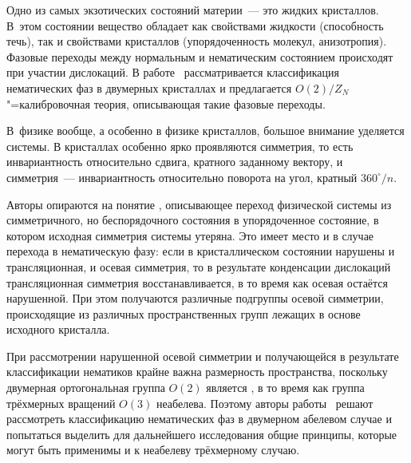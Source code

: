 \documentclass[a4paper, 14pt, titlepage]{extarticle}
\begin{document}
  Одно из самых экзотических состояний материи~--- это  жидких кристаллов.
  В~этом состоянии вещество обладает как свойствами жидкости (способность течь), так и свойствами
  кристаллов (упорядоченность молекул, анизотропия). Фазовые переходы между нормальным и
  нематическим состоянием происходят при участии дислокаций. В работе~\cite{liu-nematic}
  рассматривается классификация нематических фаз в двумерных кристаллах и предлагается
  $O(2)/Z_N$"=калибровочная теория, описывающая такие фазовые переходы.

  В~физике вообще, а особенно в физике кристаллов, большое внимание уделяется 
  системы. В кристаллах особенно ярко проявляются  симметрия, то есть
  инвариантность относительно сдвига, кратного заданному вектору, и  симметрия~---
  инвариантность относительно поворота на угол, кратный $360^\circ/n$.

  Авторы опираются на понятие , описывающее переход физической
  системы из симметричного, но беспорядочного состояния в упорядоченное состояние, в котором
  исходная симметрия системы утеряна. Это имеет место и в случае перехода в нематическую фазу: если
  в кристаллическом состоянии нарушены и трансляционная, и осевая симметрия, то в результате
  конденсации дислокаций трансляционная симметрия восстанавливается, в то время как осевая остаётся
  нарушенной. При этом получаются различные подгруппы осевой симметрии, происходящие из различных
  пространственных групп лежащих в основе исходного кристалла.

  При рассмотрении нарушенной осевой симметрии и получающейся в результате классификации нематиков
  крайне важна размерность пространства, поскольку двумерная ортогональная группа $O(2)$ является
  , в то время как группа трёхмерных вращений $O(3)$ неабелева. Поэтому авторы
  работы~\cite{liu-nematic} решают рассмотреть классификацию нематических фаз в двумерном абелевом
  случае и попытаться выделить для дальнейшего исследования общие принципы, которые могут быть
  применимы и к неабелеву трёхмерному случаю.
\end{document}
